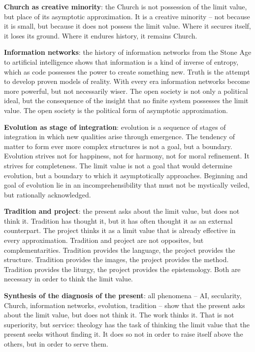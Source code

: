 \documentclass[
  english,
]{article}
\begin{document}
\textbf{Church as creative minority}: the Church is not possession of
the limit value, but place of its asymptotic approximation. It is a
creative minority -- not because it is small, but because it does not
possess the limit value. Where it secures itself, it loses its ground.
Where it endures history, it remains Church.

\textbf{Information networks}: the history of information networks from
the Stone Age to artificial intelligence shows that information is a
kind of inverse of entropy, which as code possesses the power to create
something new. Truth is the attempt to develop proven models of reality.
With every era information networks become more powerful, but not
necessarily wiser. The open society is not only a political ideal, but
the consequence of the insight that no finite system possesses the limit
value. The open society is the political form of asymptotic
approximation.

\textbf{Evolution as stage of integration}: evolution is a sequence of
stages of integration in which new qualities arise through emergence.
The tendency of matter to form ever more complex structures is not a
goal, but a boundary. Evolution strives not for happiness, not for
harmony, not for moral refinement. It strives for completeness. The
limit value is not a goal that would determine evolution, but a boundary
to which it asymptotically approaches. Beginning and goal of evolution
lie in an incomprehensibility that must not be mystically veiled, but
rationally acknowledged.

\textbf{Tradition and project}: the present asks about the limit value,
but does not think it. Tradition has thought it, but it has often
thought it as an external counterpart. The project thinks it as a limit
value that is already effective in every approximation. Tradition and
project are not opposites, but complementarities. Tradition provides the
language, the project provides the structure. Tradition provides the
images, the project provides the method. Tradition provides the liturgy,
the project provides the epistemology. Both are necessary in order to
think the limit value.

\textbf{Synthesis of the diagnosis of the present}: all phenomena -- AI,
secularity, Church, information networks, evolution, tradition -- show
that the present asks about the limit value, but does not think it. The
work thinks it. That is not superiority, but service: theology has the
task of thinking the limit value that the present seeks without finding
it. It does so not in order to raise itself above the others, but in
order to serve them.
\end{document}
